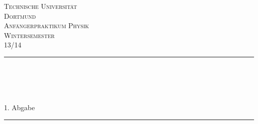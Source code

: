 \begin{titlepage}

\begin{center}

\vspace*{2cm}

\textsc{\LARGE Technische Universität\\ Dortmund}\\[1.5cm]

\textsc{\Large Anfängerpraktikum Physik\\ Wintersemester \\ 13/14}\\[0.5cm]


\newcommand{\HRule}{\rule{\linewidth}{0.5mm}}
\HRule \\[0.4cm]
{ \huge \bfseries \VNr }\\[0.4cm]
{ \huge \bfseries \VN }\\[0.4cm]
{\large \VD}\\[0.4cm]
{\Large 1. Abgabe}
\HRule \\[1.5cm]

\begin{minipage}{0.4\textwidth}
\begin{flushleft} \large
\Namen
\end{flushleft}
\end{minipage}
\hfill
\begin{minipage}{0.4\textwidth}
\begin{flushright} \large
\Emails
\end{flushright}
\end{minipage}

\vfill



\end{center}

\end{titlepage}